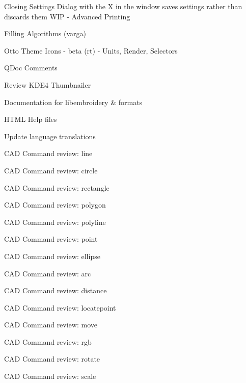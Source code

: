\begin{DoxyRefList}
Closing Settings Dialog with the X in the window saves settings rather than discards them WIP -\/ Advanced Printing 



Filling Algorithms (varga) 



Otto Theme Icons -\/ beta (rt) -\/ Units, Render, Selectors

\label{todo__todo000006}%
%
QDoc Comments 



Review KDE4 Thumbnailer 



Documentation for libembroidery \& formats 



HTML Help files 



Update language translations 



CAD Command review\+: line 



CAD Command review\+: circle 



CAD Command review\+: rectangle 



CAD Command review\+: polygon 



CAD Command review\+: polyline 



CAD Command review\+: point 



CAD Command review\+: ellipse 



CAD Command review\+: arc 



CAD Command review\+: distance 



CAD Command review\+: locatepoint 



CAD Command review\+: move 



CAD Command review\+: rgb 



CAD Command review\+: rotate 



CAD Command review\+: scale 




\end{DoxyRefList}

